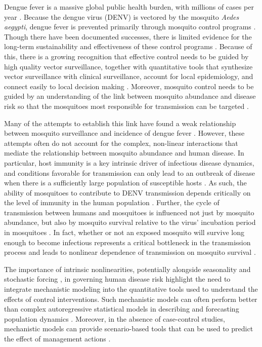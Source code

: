 \documentclass[10pt,letterpaper]{article}
\begin{document}
Dengue fever is a massive global public health burden, with millions of cases per year \cite{Bhatt2013}.  
Because the dengue virus (DENV) is vectored by the mosquito \textit{Aedes aegypti}, dengue fever is prevented primarily through mosquito control programs \cite{Achee2015}.
Though there have been documented successes, there is limited evidence for the long-term sustainability and effectiveness of these control programs \cite{Morrison2008}.
Because of this, there is a growing recognition that effective control needs to be guided by high quality vector surveillance, together with quantitative tools that synthesize vector surveillance with clinical surveillance, account for local epidemiology, and connect easily to local decision making \cite{Morrison2008, Scott2010b}.
Moreover, mosquito control needs to be guided by an understanding of the link between mosquito abundance and disease risk so that the mosquitoes most responsible for transmission can be targeted \cite{Scott2010a, Scott2010b}.

Many of the attempts to establish this link have found a weak relationship between mosquito surveillance and incidence of dengue fever \cite{Bowman2014, Pepin2015, Cromwell2017}.
However, these attempts often do not account for the complex, non-linear interactions that mediate the relationship between mosquito abundance and human disease.
In particular, host immunity is a key intrinsic driver of infectious disease dynamics, and conditions favorable for transmission can only lead to an outbreak of disease when there is a sufficiently large population of susceptible hosts \cite{Koelle2004, Koelle2005}.
As such, the ability of mosquitoes to contribute to DENV transmission depends critically on the level of immunity in the human population \cite{Scott2010a}.
Further, the cycle of transmission between humans and mosquitoes is influenced not just by mosquito abundance, but also by mosquito survival relative to the virus' incubation period in mosquitoes \cite{Smith2012}.
In fact, whether or not an exposed mosquito will survive long enough to become infectious represents a critical bottleneck in the transmission process and leads to nonlinear dependence of transmission on mosquito survival \cite{Smith2012}.

The importance of intrinsic nonlinearities, potentially alongside seasonality and stochastic forcing \cite{Ellner1998, Koelle2004, Grenfell2002}, in governing human disease risk highlight the need to integrate mechanistic modeling into the quantitative tools used to understand the effects of control interventions.
Such mechanistic models can often perform better than complex autoregressive statistical models in describing and forecasting population dynamics \cite{Reilly2005}.
Moreover, in the absence of case-control studies, mechanistic models can provide scenario-based tools that can be used to predict the effect of management actions \cite{Buckland2007}.
\end{document}

